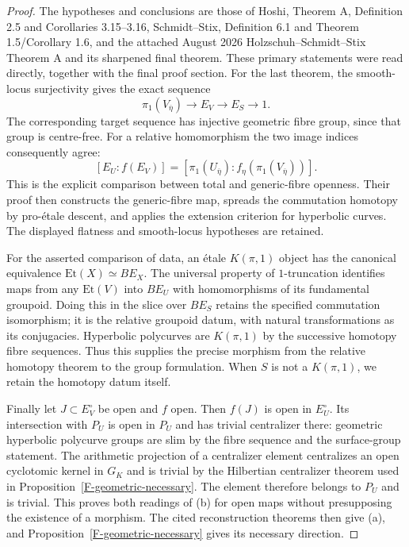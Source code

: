 \documentclass[11pt,oneside]{article}
\begin{document}
\begin{proof}
The hypotheses and conclusions are those of Hoshi, Theorem A,
Definition 2.5 and Corollaries 3.15--3.16\cite{F-HoshiPoly},
Schmidt--Stix, Definition 6.1 and Theorem 1.5/Corollary
1.6\cite{F-SchmidtStix}, and the attached August 2026
Holzschuh--Schmidt--Stix Theorem A and its sharpened final
theorem\cite{F-HolzschuhSchmidtStix}. These primary statements
were read directly, together with the final proof section.
For the last theorem, the smooth-locus surjectivity gives
the exact sequence
\[
 \pi_1(V_{\overline\eta})\longrightarrow E_V
     \longrightarrow E_S\longrightarrow1.
\]
The corresponding target sequence has injective geometric
fibre group, since that group is centre-free. For a relative
homomorphism the two image indices consequently agree:
\[
 [E_U:f(E_V)]
 = [\pi_1(U_{\overline\eta}):
                f_\eta(\pi_1(V_{\overline\eta}))].
\]
This is the explicit comparison between total and generic-fibre
openness. Their proof then constructs the generic-fibre map,
spreads the commutation homotopy by pro-\'etale descent, and
applies the extension criterion for hyperbolic curves. The
displayed flatness and smooth-locus hypotheses are retained.

For the asserted comparison of data, an \'etale $K(\pi,1)$
object has the canonical equivalence
$\mathrm{Et}(X)\simeq B E_X$. The universal property of
$1$-truncation identifies maps from any $\mathrm{Et}(V)$ into
$B E_U$ with homomorphisms of its fundamental groupoid. Doing
this in the slice over $B E_S$ retains the specified
commutation isomorphism; it is the relative groupoid datum,
with natural transformations as its conjugacies. Hyperbolic
polycurves are $K(\pi,1)$ by the successive homotopy fibre
sequences. Thus this supplies the precise morphism from the
relative homotopy theorem to the group formulation. When $S$
is not a $K(\pi,1)$, we retain the homotopy datum itself.

Finally let $J\subset E_V^\circ$ be open and $f$ open.
Then $f(J)$ is open in $E_U^\circ$. Its intersection with
$P_U$ is open in $P_U$ and has trivial centralizer there:
geometric hyperbolic polycurve groups are slim by the fibre
sequence and the surface-group statement. The arithmetic
projection of a centralizer element centralizes an open
cyclotomic kernel in $G_K$ and is trivial by the Hilbertian
centralizer theorem used in Proposition~\ref{F-geometric-necessary}.
The element therefore belongs to $P_U$ and is trivial. This
proves both readings of (b) for open maps without presupposing
the existence of a morphism. The cited reconstruction theorems
then give (a), and Proposition~\ref{F-geometric-necessary}
gives its necessary direction.
\end{proof}
\end{document}
